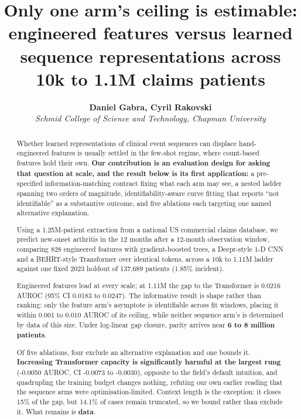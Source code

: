 \documentclass[10pt,twocolumn,letterpaper]{article}
\title{\bfseries Only one arm's ceiling is estimable: engineered features versus learned sequence representations across 10k to 1.1M claims patients}
\author{\textbf{Daniel Gabra, Cyril Rakovski}\\[3pt]{\normalsize \emph{Schmid College of Science and Technology, Chapman University}}}
\date{}
\begin{document}
\maketitle
\begin{abstract}

Whether learned representations of clinical event sequences can displace hand-engineered features
is usually settled in the few-shot regime, where count-based features hold their own. \textbf{Our
contribution is an evaluation design for asking that question at scale, and the result below is
its first application:} a pre-specified information-matching contract fixing what each arm may
see, a nested ladder spanning two orders of magnitude, identifiability-aware curve fitting that
reports ``not identifiable'' as a substantive outcome, and five ablations each targeting one named
alternative explanation.

Using a 1.25M-patient extraction from a national US commercial claims database, we predict
new-onset arthritis in the 12 months after a 12-month observation window, comparing 828
engineered features with gradient-boosted trees, a Deepr-style 1-D CNN and a BEHRT-style
Transformer over identical tokens, across a 10k to 1.11M ladder against one fixed 2023 holdout of
137,689 patients (1.85\% incident).

Engineered features lead at every scale; at 1.11M the gap to the Transformer is 0.0216 AUROC (95\%
CI 0.0183 to 0.0247). The informative result is shape rather than ranking: only the feature arm's
asymptote is identifiable across fit windows, placing it within 0.001 to 0.010 AUROC of its
ceiling, while neither sequence arm's is determined by data of this size. Under log-linear gap
closure, parity arrives near \textbf{6 to 8 million patients}.

Of five ablations, four exclude an alternative explanation and one bounds it. \textbf{Increasing
Transformer capacity is significantly harmful at the largest rung} (-0.0050 AUROC, CI -0.0073 to
-0.0030), opposite to the field's default intuition, and quadrupling the training budget changes
nothing, refuting our own earlier reading that the sequence arms were optimisation-limited.
Context length is the exception: it closes 15\% of the gap, but 14.1\% of cases remain truncated,
so we bound rather than exclude it. What remains is \textbf{data}.

\end{abstract}
\end{document}
